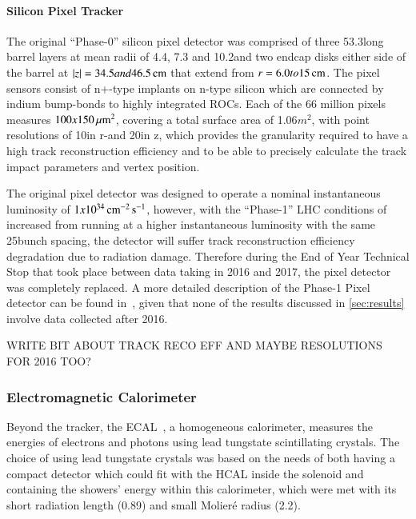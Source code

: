 \paragraph{Silicon Pixel Tracker}
The original ``Phase-0'' silicon pixel detector was comprised of three 53.3\cm long barrel layers at mean radii of 4.4, 7.3 and 10.2\cm and two endcap disks either side of the barrel at $|z| = 34.5 and 46.5\,\text{cm}$ that extend from $r = 6.0 to 15\,\text{cm}$.
The pixel sensors consist of n+-type implants on n-type silicon which are connected by indium bump-bonds to highly integrated ROCs.
Each of the 66 million pixels measures $100x150\,\mu\text{m}^{2}$, covering a total surface area of 1.06$m^{2}$, with point resolutions of 10\mum in r-\phi and 20\mum in z, which provides the granularity required to have a high track reconstruction efficiency and to be able to precisely calculate the track impact parameters and vertex position.

The original pixel detector was designed to operate a nominal instantaneous luminosity of $1x10^{34}\,\text{cm}^\text{$-$2}\,\text{s}^\text{$-$1}$, however, with the ``Phase-1'' LHC conditions of increased \PU from running at a higher instantaneous luminosity with the same 25\ns bunch spacing, the detector will suffer track reconstruction efficiency degradation due to radiation damage.
Therefore during the End of Year Technical Stop that took place between data taking in 2016 and 2017, the pixel detector was completely replaced.
A more detailed description of the Phase-1 Pixel detector can be found in~\cite{CMS:2012sda}, given that none of the results discussed in \ref{sec:results} involve data collected after 2016.

WRITE BIT ABOUT TRACK RECO EFF AND MAYBE RESOLUTIONS FOR 2016 TOO?

\subsubsection{Electromagnetic Calorimeter}\label{subsubsec:ECAL}
Beyond the tracker, the ECAL~\cite{CMS:1997ysd,CMS:2002xia}, a homogeneous calorimeter, measures the energies of electrons and photons using lead tungstate scintillating crystals. 
The choice of using lead tungstate crystals was based on the needs of both having a compact detector which could fit with the HCAL inside the solenoid and containing the showers' energy within this calorimeter, which were met with its short radiation length (0.89\cm) and small Molier\'{e} radius (2.2\cm).

